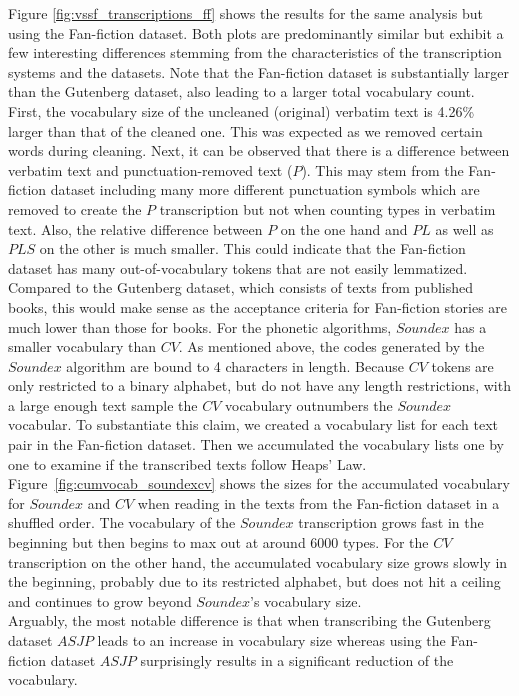 Figure \ref{fig:vssf_transcriptions_ff} shows the results for the same analysis but using the Fan-fiction dataset.
Both plots are predominantly similar but exhibit a few interesting differences stemming from the characteristics of the transcription systems and the datasets.
Note that the Fan-fiction dataset is substantially larger than the Gutenberg dataset, also leading to a larger total vocabulary count.\\
First, the vocabulary size of the uncleaned (original) verbatim text is 4.26\% larger than that of the cleaned one.
This was expected as we removed certain words during cleaning.
Next, it can be observed that there is a difference between verbatim text and punctuation-removed text ($P$).
This may stem from the Fan-fiction dataset including many more different punctuation symbols which are removed to create the $P$ transcription but not when counting types in verbatim text.
Also, the relative difference between $P$ on the one hand and $PL$ as well as $PLS$ on the other is much smaller.
This could indicate that the Fan-fiction dataset has many out-of-vocabulary tokens that are not easily lemmatized.
Compared to the Gutenberg dataset, which consists of texts from published books, this would make sense as the acceptance criteria for Fan-fiction stories are much lower than those for books.
For the phonetic algorithms, $Soundex$ has a smaller vocabulary than $CV$.
As mentioned above, the codes generated by the $Soundex$ algorithm are bound to 4 characters in length.
Because $CV$ tokens are only restricted to a binary alphabet, but do not have any length restrictions, with a large enough text sample the $CV$ vocabulary outnumbers the $Soundex$ vocabular.
To substantiate this claim, we created a vocabulary list for each text pair in the Fan-fiction dataset.
Then we accumulated the vocabulary lists one by one to examine if the transcribed texts follow Heaps' Law.
Figure~\ref{fig:cumvocab_soundexcv} shows the sizes for the accumulated vocabulary for $Soundex$ and $CV$ when reading in the texts from the Fan-fiction dataset in a shuffled order.
The vocabulary of the $Soundex$ transcription grows fast in the beginning but then begins to max out at around 6000 types.
For the $CV$ transcription on the other hand, the accumulated vocabulary size grows slowly in the beginning, probably due to its restricted alphabet, but does not hit a ceiling and continues to grow beyond $Soundex$'s vocabulary size.\\
Arguably, the most notable difference is that when transcribing the Gutenberg dataset $ASJP$ leads to an increase in vocabulary size whereas using the Fan-fiction dataset $ASJP$ surprisingly results in a significant reduction of the vocabulary.
